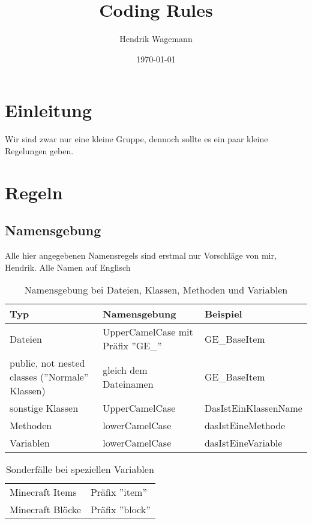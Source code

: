 \documentclass{scrartcl}
\title{Coding Rules}
\author{Hendrik Wagemann}
\date{\today}
\begin{document}
\maketitle
\tableofcontents

\section{Einleitung}
\label{introduction}
Wir sind zwar nur eine kleine Gruppe, dennoch sollte es ein paar kleine Regelungen geben.

\section{Regeln}
\label{rules}

\subsection{Namensgebung}
\label{rules_naming}
Alle hier angegebenen Namensregels sind erstmal nur Vorschläge von mir, Hendrik.
Alle Namen auf Englisch
\begin{table}
	\begin{tabular}{ l | l | l }
		\textbf{Typ} & \textbf{Namensgebung} & \textbf{Beispiel} \\ 
		\hline
		Dateien & UpperCamelCase mit Präfix ''GE_'' & GE_BaseItem \\ 
		public, not nested classes (''Normale'' Klassen) & gleich dem Dateinamen & GE_BaseItem \\ 
		sonstige Klassen &	UpperCamelCase & DasIstEinKlassenName \\ 
		Methoden & lowerCamelCase & dasIstEineMethode \\ 
		Variablen & lowerCamelCase & dasIstEineVariable \\ 
	\end{tabular}
	\label{rules_naming_table1}
	\caption{Namensgebung bei Dateien, Klassen, Methoden und Variablen}
\end{table}
\begin{table}
	\begin{tabular}{ l | l }
		Minecraft Items & Präfix ''item'' \\ 
		Minecraft Blöcke & Präfix ''block'' \\ 
	\end{tabular}
	\label{rules_naming_table2}
	\caption{Sonderfälle bei speziellen Variablen}
\end{table}
\end{document}
